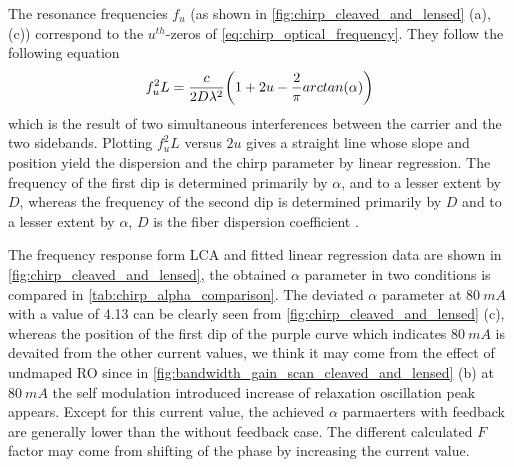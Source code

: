 The resonance frequencies $f_u$ (as shown in \autoref{fig:chirp_cleaved_and_lensed} (a), (c)) correspond to the $u^{th}$-zeros of \autoref{eq:chirp_optical_frequency}. They follow the following equation \cite{devaux1993simple}
\begin{equation}
    f_u^2L=\frac{c}{2D\lambda ^2}\qty(1+2u-\frac{2}{\pi}arctan(\alpha))
    \label{eq:LCA_equation}
\end{equation}
which is the result of two simultaneous interferences between the carrier and the two sidebands. Plotting $f_u^2L$ versus $2u$ gives a straight line whose slope and position yield the dispersion and the chirp parameter by linear regression. The frequency of the first dip is determined primarily by $\alpha$, and to a lesser extent by $D$, whereas the frequency of the second dip is determined primarily by $D$ and to a lesser extent by $\alpha$, $D$ is the fiber dispersion coefficient \cite{srinivasan1995using}.

The frequency response form LCA and fitted linear regression data are shown in \autoref{fig:chirp_cleaved_and_lensed}, the obtained $\alpha$ parameter in two conditions is compared in \autoref{tab:chirp_alpha_comparison}. The deviated $\alpha$ parameter at $80 \ mA$ with a value of 4.13 can be clearly seen from \autoref{fig:chirp_cleaved_and_lensed} (c), whereas the position of the first dip of the purple curve which indicates $80 \ mA$ is devaited from the other current values, we think it may come from the effect of undmaped RO since in \autoref{fig:bandwidth_gain_scan_cleaved_and_lensed} (b) at $80 \ mA$ the self modulation introduced increase of relaxation oscillation peak appears. Except for this current value, the achieved $\alpha$ parmaerters with feedback are generally lower than the without feedback case. The different calculated $F$ factor may come from shifting of the phase by increasing the current value.

